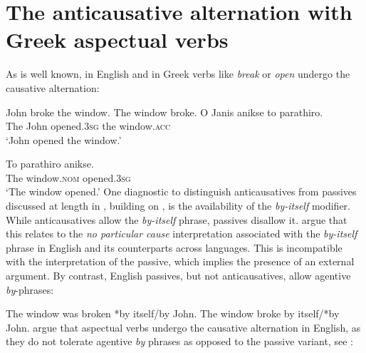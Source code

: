 \documentclass[output=paper]{langscibook}
\begin{document}
\section{The anticausative alternation with Greek aspectual verbs}

As is well known, in English and in Greek verbs like \textit{break} or \textit{open} undergo the causative alternation:

\ea%
    \label{alexiadouex:key:3}
    \ea John broke the window.
    \ex The window broke.
    \z 
\ex%
    \label{alexiadouex:key:4}
    \ea
        \gll O Janis anikse    to parathiro.\\
        The John opened.\textsc{3sg}  the window.\textsc{acc}\\
        \glt ‘John opened the window.’
    
    \ex
        \gll To parathiro    anikse.\\
        The window.\textsc{nom} opened.\textsc{3sg}\\
        \glt ‘The window opened.’
    \z 
\z
One diagnostic to distinguish anticausatives from passives discussed at length in \citet{AlexiadouAnagnostopoulouSchafer2015}, 
building on \citet{LevinRappaportHovav1995}, is the availability of the \textit{by-itself} modifier. 
While anticausatives allow the \textit{by-itself} phrase, passives disallow it. 
\citet{AlexiadouAnagnostopoulouSchafer2015} argue that this relates to the \textit{no particular cause} interpretation 
associated with the \textit{by-itself} phrase in English and its counterparts across languages. 
This is incompatible with the interpretation of the passive, which implies the presence of an external argument. 
By contrast, English passives, but not anticausatives, allow agentive \textit{by}-phrases:

\ea%
    \label{alexiadouex:key:5}
    \ea The window was broken *by itself/by John.
    \ex The window broke by itself/*by John.
    \z 
\z 
\citet{MourounasWilliamson2019} argue that aspectual verbs undergo the causative alternation in English, 
as they do not tolerate agentive \textit{by} phrases as opposed to the passive variant, see :
\end{document}
